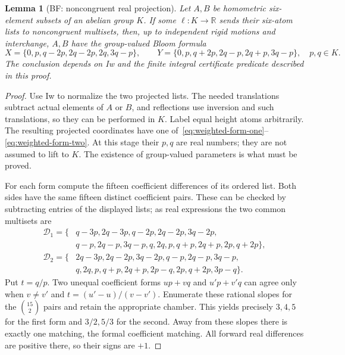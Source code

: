 \documentclass[11pt]{article}
\newtheorem{lemma}[theorem]{Lemma}
\theoremstyle{remark}
\newcommand{\R}{\mathbb R}
\begin{document}
\begin{lemma}[BF: noncongruent real projection]\label{lem:bf}
Let $A,B$ be homometric six-element subsets of an abelian group $K$.
If some $\ell:K\to\R$ sends their six-atom lists to noncongruent
multisets, then, up to independent rigid motions and interchange,
$A,B$ have the group-valued Bloom formula
\[
 X=\{0,p,q-2p,2q-2p,2q,3q-p\},\qquad
 Y=\{0,p,q+2p,2q-p,2q+p,3q-p\},\quad p,q\in K.
\]
The conclusion depends on Iw and the finite integral certificate predicate
described in this proof.
\end{lemma}
\begin{proof}
Use Iw to normalize the two projected lists. The needed translations
subtract actual elements of $A$ or $B$, and reflections use inversion
and such translations, so they can be performed in $K$. Label equal
height atoms arbitrarily. The resulting projected coordinates have one
of~\eqref{eq:weighted-form-one}--\eqref{eq:weighted-form-two}. At this
stage their $p,q$ are real numbers; they are not assumed to lift to $K$.
The existence of group-valued parameters is what must be proved.

For each form compute the fifteen coefficient differences of its ordered
list. Both sides have the same fifteen distinct coefficient pairs. These
can be checked by subtracting entries of the displayed lists; as real
expressions the two common multisets are
\begin{align*}
 \mathcal D_1=\{&q-3p,2q-3p,q-2p,2q-2p,3q-2p,\\
 &q-p,2q-p,3q-p,q,2q,p,q+p,2q+p,2p,q+2p\},\\
 \mathcal D_2=\{&2q-3p,2q-2p,3q-2p,q-p,2q-p,3q-p,\\
 &q,2q,p,q+p,2q+p,2p-q,2p,q+2p,3p-q\}.
\end{align*}
Put $t=q/p$. Two unequal coefficient forms $up+vq$ and $u'p+v'q$
can agree only when $v\ne v'$ and
$t=(u'-u)/(v-v')$. Enumerate these rational slopes for the $\binom{15}{2}$
pairs and retain the appropriate chamber. This yields precisely $3,4,5$
for the first form and $3/2,5/3$ for the second. Away from these slopes
there is exactly one matching, the formal coefficient matching. All
forward real differences are positive there, so their signs are $+1$.


\end{proof}
\end{document}
